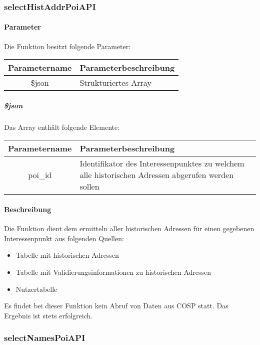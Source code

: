 \subsubsection{selectHistAddrPoiAPI}
\paragraph{Parameter} Die Funktion besitzt folgende Parameter:
\begin{table}[H]
	\begin{tabular}{|c|p{11cm}|}
		\hline
		\textbf{Parametername} & \textbf{Parameterbeschreibung} \\ \hline
		\$json & Strukturiertes Array \\ \hline
	\end{tabular}
\end{table}
\subparagraph{\$json}Das Array enthält folgende Elemente:
\begin{table}[H]
	\begin{tabular}{|c|p{11cm}|}
		\hline
		\textbf{Parametername} & \textbf{Parameterbeschreibung} \\ \hline
		poi\_id & Identifikator des Interessenpunktes zu welchem alle historischen Adressen abgerufen werden sollen \\ \hline
	\end{tabular}
\end{table}
\paragraph{Beschreibung} Die Funktion dient dem ermitteln aller historischen Adressen für einen gegebenen Interessenpunkt aus folgenden Quellen:
\begin{itemize}
	\item Tabelle mit historischen Adressen
	\item Tabelle mit Validierungsinformationen zu historischen Adressen
	\item Nutzertabelle
\end{itemize}
Es findet bei dieser Funktion kein Abruf von Daten aus {\glqq COSP\grqq} statt. Das Ergebnis ist stets erfolgreich.
\subsubsection{selectNamesPoiAPI}

